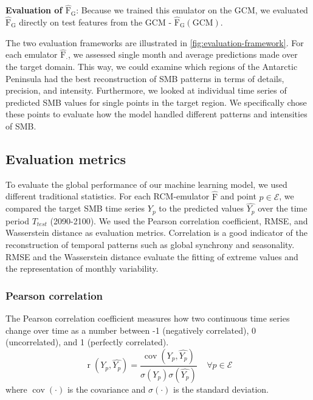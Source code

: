 \documentclass[a4paper,11pt,oneside]{report}
\begin{document}
\textbf{Evaluation of $\mathrm{\hat{F}_G}$}: Because we trained this emulator on the GCM, we evaluated $\mathrm{\hat{F}_G}$ directly on test features from the GCM - $\mathrm{\hat{F}_G(GCM)}$.

The two evaluation frameworks are illustrated in \autoref{fig:evaluation-framework}. For each emulator $\mathrm{\hat{F}_{\cdot}}$, we assessed single month and average predictions made over the target domain. This way, we could examine which regions of the Antarctic Peninsula had the best reconstruction of SMB patterns in terms of details, precision, and intensity. Furthermore, we looked at individual time series of predicted SMB values for single points in the target region. We specifically chose these points to evaluate how the model handled different patterns and intensities of SMB.  

\subsection{Evaluation metrics}\label{subsec:evaluation-metrics} 

To evaluate the global performance of our machine learning model, we used different traditional statistics. For each RCM-emulator $\mathrm{\hat{F}}$ and point $p \in \mathcal{E}$, we compared the target SMB time series $Y_{p}$ to the predicted values $\widehat{Y_{p}}$ over the time period $T_{test}$ (2090-2100). We used the Pearson correlation coefficient, RMSE, and Wasserstein distance as evaluation metrics. Correlation is a good indicator of the reconstruction of temporal patterns such as global synchrony and seasonality. RMSE and the Wasserstein distance evaluate the fitting of extreme values and the representation of monthly variability. 

\subsubsection{Pearson correlation}\label{subsubsec:pearson-corr}
The Pearson correlation coefficient measures how two continuous time series change over time as a number between -1 (negatively correlated), 0 (uncorrelated), and 1 (perfectly correlated).
\begin{equation}
    \operatorname{r}\left(Y_{p},\widehat{Y_{p}}\right) = \frac{\operatorname{cov}(Y_{p},\widehat{Y_{p}})}{\sigma(Y_{p})\sigma(\widehat{Y_{p}})} \;\;\;\; \forall p \in \mathcal{E} 
\end{equation}
where $\operatorname {cov}(\cdot)$  is the covariance and  $\sigma(\cdot)$ is the standard deviation.
\end{document}
